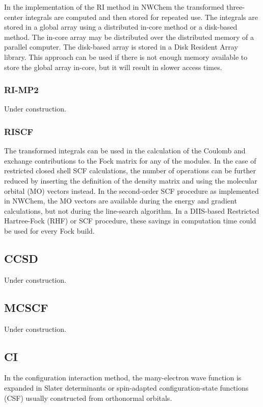 In the implementation of the RI method in NWChem the transformed three-center integrals
are computed and then stored for repeated use.  The integrals are stored in
a global array
using a distributed in-core method or a disk-based method.
The in-core array may be distributed over the distributed memory of a
parallel computer.  The disk-based array is stored in a Disk Resident Array
library.  This approach can be used if there is not enough memory available to
store the global array in-core, but it will result in slower access times.

\subsubsection{RI-MP2}

Under construction.

\subsubsection{RISCF}

The transformed integrals can be used in the calculation of the Coulomb and
exchange contributions to the Fock matrix for any of the modules.
In the case of restricted closed shell SCF calculations, the number of operations
can be further reduced by inserting the definition of the density matrix
and using the molecular orbital (MO) vectors instead.  In the second-order SCF
procedure as implemented in NWChem, the MO vectors are available during
the energy and gradient calculations, but not during the line-search algorithm.
In a DIIS-based Restricted Hartree-Fock (RHF) or SCF procedure, these savings
in computation time could be used for every Fock build.

\subsection{CCSD}

Under construction.

\subsection{MCSCF}

Under construction.

\subsection{CI}

In the configuration interaction method, the many-electron wave function
is expanded in Slater determinants or spin-adapted configuration-state
functions (CSF) usually constructed from orthonormal orbitals.

